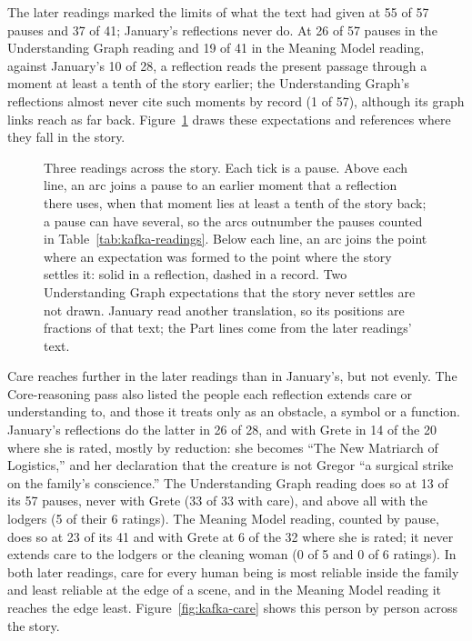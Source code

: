 \documentclass[11pt]{article}
\begin{document}
The later readings marked the
limits of what the text had given at 55 of 57 pauses and 37 of 41; January's
reflections never do. At 26 of 57 pauses in the Understanding Graph reading and
19 of 41 in the Meaning Model reading, against January's 10 of 28, a reflection
reads the present passage through a moment at least a tenth of the story earlier; the
Understanding Graph's reflections almost never cite such moments by record (1 of
57), although its graph links reach as far back.
Figure~\ref{fig:kafka-readings} draws these expectations and references where
they fall in the story.

\begin{figure}[htb]
    \centering
    
    \caption{Three readings across the story. Each tick is a pause. Above each line, an arc joins a pause to an earlier moment that a reflection there uses, when that moment lies at least a tenth of the story back; a pause can have several, so the arcs outnumber the pauses counted in Table~\ref{tab:kafka-readings}. Below each line, an arc joins the point where an expectation was formed to the point where the story settles it: solid in a reflection, dashed in a record. Two Understanding Graph expectations that the story never settles are not drawn. January read another translation, so its positions are fractions of that text; the Part lines come from the later readings' text.}
    \label{fig:kafka-readings}
\end{figure}

Care reaches further in the later readings than in January's, but not evenly.
The Core-reasoning pass also listed the people each reflection extends care or
understanding to, and those it treats only as an obstacle, a symbol or a
function. January's reflections do the latter in 26 of 28, and with Grete in
14 of the 20 where she is rated, mostly by reduction: she becomes ``The New
Matriarch of Logistics,'' and her declaration that the creature is not
Gregor ``a surgical strike on the family's conscience.'' The Understanding Graph reading does so at 13 of its 57 pauses,
never with Grete (33 of 33 with care), and above all with the lodgers (5 of
their 6 ratings). The Meaning Model reading, counted by pause, does so at 23 of
its 41 and with Grete at 6 of the 32 where she is rated; it never extends care
to the lodgers or the cleaning woman (0 of 5 and 0 of 6 ratings). In both later
readings, care for every human being is most reliable inside the family and
least reliable at the edge of a scene, and in the Meaning Model reading it
reaches the edge least. Figure~\ref{fig:kafka-care} shows this person by person
across the story.
\end{document}
